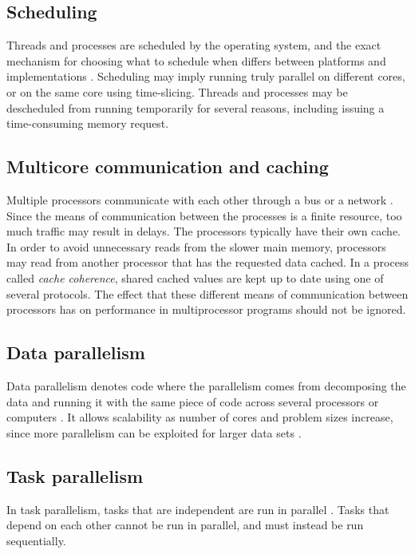 \subsection{Scheduling}
Threads and processes are scheduled by the operating system, and the exact mechanism for choosing what to schedule when differs
between platforms and implementations \cite[p. 472]{herlihy_2012_art_taomprr}. Scheduling may imply running truly parallel
on different cores, or on the same core using time-slicing. Threads and processes may be descheduled from running temporarily for several
reasons, including issuing a time-consuming memory request.

\subsection{Multicore communication and caching}
Multiple processors communicate with each other through a bus or a network \cite[p. 472-476]{herlihy_2012_art_taomprr}. Since the
means of communication between the processes is a finite resource, too much traffic may result in delays. The processors typically
have their own cache. In order to avoid unnecessary reads from the slower main memory, processors may read from another processor
that has the requested data cached. In a process called \emph{cache coherence}, shared cached values are kept up to date using one
of several protocols. The effect that these different means of communication between processors has on performance in
multiprocessor programs should not be ignored.

\subsection{Data parallelism}
Data parallelism denotes code where the parallelism comes from decomposing the data and running it with the same piece of code
across several processors or computers \cite{singh_2013_parallel_padpwprfmm}. It allows scalability as number of cores and problem
sizes increase, since more parallelism can be exploited for larger data sets \cite[p. 24]{mccool_2012_structured_spppfec}.

\subsection{Task parallelism}
In task parallelism, tasks that are independent are run in parallel \cite{singh_2013_parallel_padpwprfmm}.
Tasks that depend on each other cannot be run in parallel, and must instead be run sequentially.

